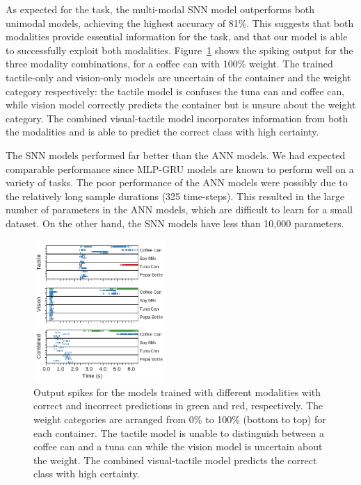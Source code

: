 \documentclass[fyp]{socreport}
\begin{document}
As expected for the task, the multi-modal SNN model outperforms both unimodal
models, achieving the highest accuracy of 81\%. This suggests that both
modalities provide essential information for the task, and that our model is
able to successfully exploit both modalities. Figure~\ref{fig:spikeclass} shows
the spiking output for the three modality combinations, for a coffee can with
100\% weight. The trained tactile-only and vision-only models are uncertain of
the container and the weight category respectively: the tactile model is
confuses the tuna can and coffee can, while vision model correctly predicts the
container but is unsure about the weight category. The combined visual-tactile
model incorporates information from both the modalities and is able to predict
the correct class with high certainty.

The SNN models performed far better than the ANN models. We had expected
comparable performance since MLP-GRU models are known to perform well on a
variety of tasks. The poor performance of the ANN models were possibly due to
the relatively long sample durations (325 time-steps). This resulted in the
large number of parameters in the ANN models, which are difficult to learn for a
small dataset. On the other hand, the SNN models have less than 10,000
parameters.

\begin{figure}
\centering
\includegraphics[width=0.45\textwidth]{images/analysis/spike_class_output.pdf}
\caption{Output spikes for the models trained with different modalities with
  correct and incorrect predictions in green and red, respectively. The weight
  categories are arranged from 0\% to 100\% (bottom to top) for each container.
  The tactile model is unable to distinguish between a coffee can and a tuna can
  while the vision model is uncertain about the weight. The combined
  visual-tactile model predicts the correct class with high
  certainty.\label{fig:spikeclass}}
\end{figure}
\end{document}
